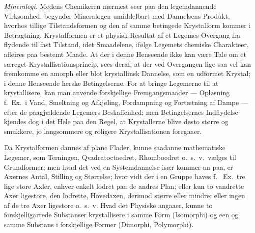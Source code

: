 \documentclass[12pt]{book}
\newcommand{\apage}[1]{\marginnote{\footnotesize\textit{[#1]}}}
\begin{document}
\emph{Mineralogi.} Medens Chemikeren nærmest seer paa den legemdannende
Virksomhed, begynder Mineralogen umiddelbart med Dannelsens Produkt,
hvorhos tillige Tilstandsformen og den af samme betingede Krystalform
kommer i Betragtning. Krystalformen er et physisk Resultat af et Legemes
Overgang fra flydende til fast Tilstand, idet Smaadelene, ifølge Legemets
chemiske Charakteer, afleires paa bestemt Maade. At der i denne Henseende
ikke kan være Tale om et særeget Krystallisationsprincip, sees deraf, at
der ved Overgangen lige saa vel kan fremkomme en amorph eller blot
krystallinsk Dannelse, som en udformet Krystal; i denne Henseende herske
Betingelserne. For at bringe Legemerne til at krystallisere, kan man
anvende forskjellige Fremgangsmaader --- Opløsning f.\ Ex.\ i Vand,
Smeltning og Afkjøling, Fordampning og Fortætning af Dampe --- efter de
paagjældende Legemers Beskaffenhed; men Betingelsernes Indflydelse kjendes
dog i det Hele paa den Regel, at Krystallerne blive desto større og
smukkere, jo langsommere og roligere Krystallisationen foregaaer.

Da Krystalformen dannes af plane Flader, kunne saadanne mathematiske
Legemer, som Terningen, Qvadratoctaedret, Rhomboedret o.\ s.\ v.\ vælges til
Grundformer; men hvad det ved en Systemdannelse især \apage{157} kommer an paa, er
Axernes Antal, Stilling og Størrelse; hvor vidt der i en Gruppe haves f.\
Ex.\ tre lige store Axler, enhver enkelt lodret paa de andres Plan; eller
kun to vandrette Axer ligestore, den lodrette, Hovedaxen, derimod større
eller mindre; eller ingen af de tre Axer ligestore o.\ s.\ v. Hvad det Physiske
angaaer, kunne to forskjelligartede Substanser krystallisere i samme Form
(Isomorphi) og een og samme Substans i forskjellige Former (Dimorphi,
Polymorphi).
\end{document}
